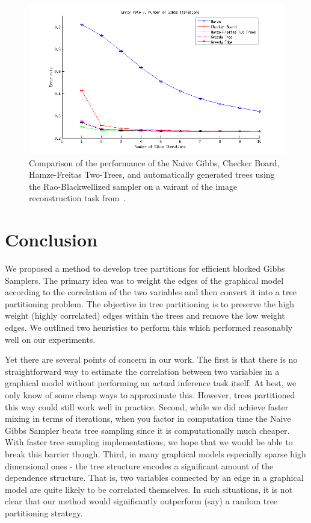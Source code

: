 \documentclass{article} %
\begin{document}
\begin{figure}
\begin{center}
\includegraphics[width=5in]{figures/figure7_real}
\caption[]{Comparison of the performance of the Naive Gibbs, Checker Board, Hamze-Freitas Two-Trees, and automatically generated trees using the Rao-Blackwellized sampler on a vairant of the image reconstruction task from~\cite{hamze2004fields}.}
\label{fig:imageRecon}
\end{center}
\end{figure}

\section{Conclusion}

We proposed a method to develop tree partitions for efficient blocked Gibbs
Samplers. The primary idea was to weight the edges of the graphical model
according to the correlation of the two variables and then convert it into a
tree partitioning problem. The objective in tree partitioning is to preserve the
high weight (highly correlated) edges within the trees and remove the low
weight edges. We outlined two heuristics to perform this which performed
reasonably well on our experiments.

Yet there are several points of concern in our work. The first is that there
is no straightforward way to estimate the correlation between two variables in a
graphical model without performing an actual inference task itself. At best, we
only know of some cheap ways to approximate this. However, trees partitioned
this way could still work well in practice. Second, while we did achieve faster
mixing in terms of iterations, when you factor in computation time the Naive
Gibbs Sampler beats tree sampling since it is computationally much cheaper. With
faster tree sampling implementations, we hope that we would be able to break
this barrier though.
Third, in many graphical models
especially sparse high dimensional ones - the tree structure encodes a
significant amount of the dependence structure. That is, two variables connected
by an edge in a graphical model are quite likely to be correlated themselves. In
such situations, it is not clear that our method would significantly outperform
(say) a random tree partitioning strategy.
\end{document}
